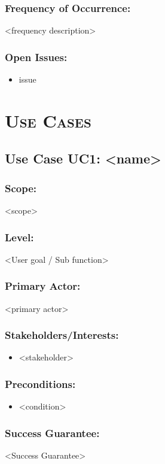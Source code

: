 \documentclass[ProductRequirements.tex]{subfiles}
\begin{document}
		\subsubsection{Frequency of Occurrence:}
			<frequency description>
		\subsubsection{Open Issues:}
			\begin{itemize}\itemsep1pt
				\item issue
			\end{itemize}		
		
	
	\section{\textsc{\Large Use Cases}}
	\subsection{Use Case UC1: <name>}
	\subsubsection{Scope:}
	<scope>
	\subsubsection{Level:}
	<User goal / Sub function>
	\subsubsection{Primary Actor:}
	<primary actor>
	\subsubsection{Stakeholders/Interests:}
	\begin{itemize}\itemsep1pt
		\item <stakeholder>
	\end{itemize}
	\subsubsection{Preconditions:}
	\begin{itemize}\itemsep1pt
		\item <condition>
	\end{itemize}
	\subsubsection{Success Guarantee:}
	<Success Guarantee>
\end{document}
